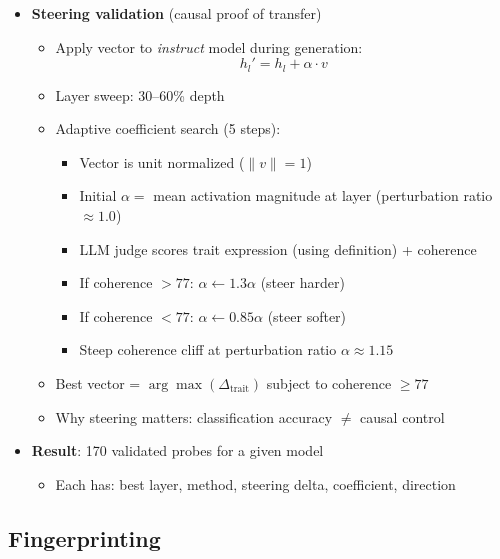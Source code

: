 \documentclass[11pt]{article}
\begin{document}
\begin{itemize}
  \item \textbf{Steering validation} (causal proof of transfer)
  \begin{itemize}
    \item Apply vector to \emph{instruct} model during generation:
    \begin{equation}
      h_l' = h_l + \alpha \cdot v
    \end{equation}
    \item Layer sweep: 30--60\% depth
    \item Adaptive coefficient search (5 steps):
    \begin{itemize}
      \item Vector is unit normalized ($\|v\| = 1$)
      \item Initial $\alpha = $ mean activation magnitude at layer (perturbation ratio $\approx 1.0$)
      \item LLM judge scores trait expression (using definition) + coherence
      \item If coherence $> 77$: $\alpha \leftarrow 1.3\alpha$ (steer harder)
      \item If coherence $< 77$: $\alpha \leftarrow 0.85\alpha$ (steer softer)
      \item Steep coherence cliff at perturbation ratio $\alpha \approx 1.15$
    \end{itemize}
    \item Best vector = $\arg\max(\Delta_{\text{trait}})$ subject to coherence $\geq 77$
    \item Why steering matters: classification accuracy $\neq$ causal control
  \end{itemize}

  \item \textbf{Result}: 170 validated probes for a given model
  \begin{itemize}
    \item Each has: best layer, method, steering delta, coefficient, direction
  \end{itemize}
\end{itemize}


\subsection{Fingerprinting}
\end{document}
